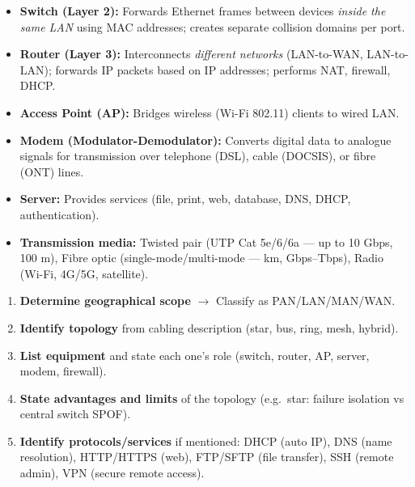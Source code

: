 \documentclass[11pt]{article}
\begin{document}
\begin{definition}
\begin{itemize}
\item \textbf{Switch (Layer 2):} Forwards Ethernet frames between devices \emph{inside the same LAN} using MAC addresses; creates separate collision domains per port.
\item \textbf{Router (Layer 3):} Interconnects \emph{different networks} (LAN-to-WAN, LAN-to-LAN); forwards IP packets based on IP addresses; performs NAT, firewall, DHCP.
\item \textbf{Access Point (AP):} Bridges wireless (Wi-Fi 802.11) clients to wired LAN.
\item \textbf{Modem (Modulator-Demodulator):} Converts digital data to analogue signals for transmission over telephone (DSL), cable (DOCSIS), or fibre (ONT) lines.
\item \textbf{Server:} Provides services (file, print, web, database, DNS, DHCP, authentication).
\item \textbf{Transmission media:} Twisted pair (UTP Cat 5e/6/6a — up to 10 Gbps, 100 m), Fibre optic (single-mode/multi-mode — km, Gbps–Tbps), Radio (Wi-Fi, 4G/5G, satellite).
\end{itemize}
\end{definition}

\begin{methode}
\begin{enumerate}
\item \textbf{Determine geographical scope} $\rightarrow$ Classify as PAN/LAN/MAN/WAN.
\item \textbf{Identify topology} from cabling description (star, bus, ring, mesh, hybrid).
\item \textbf{List equipment} and state each one's role (switch, router, AP, server, modem, firewall).
\item \textbf{State advantages and limits} of the topology (e.g.\ star: failure isolation vs central switch SPOF).
\item \textbf{Identify protocols/services} if mentioned: DHCP (auto IP), DNS (name resolution), HTTP/HTTPS (web), FTP/SFTP (file transfer), SSH (remote admin), VPN (secure remote access).
\end{enumerate}
\end{methode}
\end{document}
